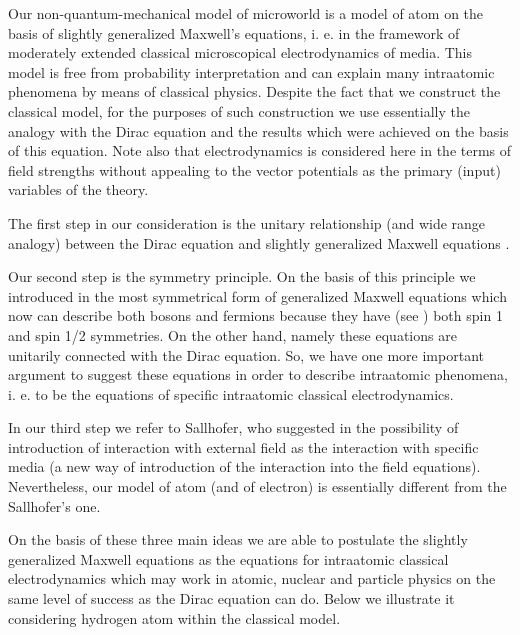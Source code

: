 \documentclass[a4paper,12pt]{article}
\begin{document}
Our non-quantum-mechanical model of microworld is a model of atom on the
basis of slightly generalized Maxwell's equations, i. e. in the framework of
moderately extended classical microscopical electrodynamics of media. This
model is free from probability interpretation and can explain many
intraatomic phenomena by means of classical physics. Despite the fact that
we construct the classical model, for the purposes of such construction we
use essentially the analogy with the Dirac equation and the results which
were achieved on the basis of this equation. Note also that electrodynamics
is considered here in the terms of field strengths without appealing to the
vector potentials as the primary (input) variables of the theory.

The first step in our consideration is the unitary relationship (and wide
range analogy) between the Dirac equation and slightly generalized Maxwell
equations \cite{S1}.

Our second step is the symmetry principle. On the basis of this principle we
introduced in \cite{SK} the most symmetrical form of generalized Maxwell
equations which now can describe both bosons and fermions because they have
(see \cite{SK}) both spin 1 and spin 1/2 symmetries. On the other hand,
namely these equations are unitarily connected with the Dirac equation. So,
we have one more important argument to suggest these equations in order to
describe intraatomic phenomena, i. e. to be the equations of specific
intraatomic classical electrodynamics.

In our third step we refer to Sallhofer, who suggested in \cite{SALL} the
possibility of introduction of interaction with external field as the
interaction with specific media (a new way of introduction of the
interaction into the field equations). Nevertheless, our model of atom (and
of electron) \cite{S1} is essentially different from the Sallhofer's one.

On the basis of these three main ideas we are able to postulate the slightly
generalized Maxwell equations as the equations for intraatomic classical
electrodynamics which may work in atomic, nuclear and particle physics on
the same level of success as the Dirac equation can do. Below we illustrate
it considering hydrogen atom within the classical model.
\end{document}
